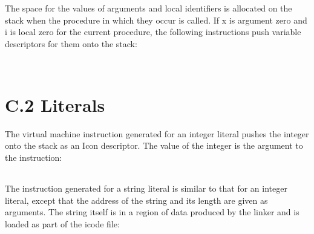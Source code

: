 The space for the values of arguments and local identifiers is
allocated on the stack when the procedure in which they occur is
called. If x is argument zero and i is local zero for the current
procedure, the following instructions push variable descriptors for
them onto the stack:

\begin{flushleft}
\tablelasttail{\hline}
\begin{supertabular}{|m{1.9066598in}|m{2.75596in}|}

\end{supertabular}
\end{flushleft}

\bigskip

\begin{flushleft}
\tablelasttail{\hline}
\begin{supertabular}{|m{1.9066598in}|m{2.75596in}|}

\end{supertabular}
\end{flushleft}


\section{C.2 Literals}

The virtual machine instruction generated for an integer literal
pushes the integer onto the stack as an Icon descriptor. The value of
the integer is the argument to the instruction:

\begin{flushleft}
\tablelasttail{\hline}
\begin{supertabular}{|m{1.9066598in}|m{2.75596in}|}

\end{supertabular}
\end{flushleft}

The instruction generated for a string literal is similar to that for
an integer literal, except that the address of the string and its
length are given as arguments. The string itself is in a region of
data produced by the linker and is loaded as part of the icode file:

